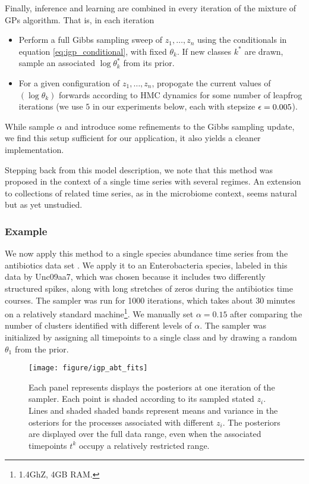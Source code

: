 \documentclass[14pt]{extarticle}
\begin{document}
Finally, inference and learning are combined in every iteration of the mixture
of GPs algorithm. That is, in each iteration
\begin{itemize}
\item Perform a full Gibbs sampling sweep of $z_1, \dots, z_n$ using the
  conditionals in equation \ref{eq:igp_conditional}, with fixed $\theta_k$. If
  new classes $k^\ast$ are drawn, sample an associated $\log \theta_k^\ast$ from
  its prior.
\item For a given configuration of $z_1, \dots, z_n$, propogate the current
  values of $\left(\log \theta_k\right)$ forwards according to HMC dynamics for
  some number of leapfrog iterations (we use $5$ in our experiments below, each
  with stepsize $\epsilon = 0.005$).
\end{itemize}

While \citep{rasmussen2006gaussian} sample $\alpha$ and introduce some
refinements to the Gibbs sampling update, we find this setup sufficient for our
application, it also yields a cleaner implementation.

Stepping back from this model description, we note that this method was
proposed in the context of a single time series with several regimes. An
extension to collections of related time series, as in the microbiome context,
seems natural but as yet unstudied.

\subsubsection{Example}
\label{subsubsec:igp_mix_example}

We now apply this method to a single species abundance time series from the
antibiotics data set \citep{dethlefsen2011incomplete}. We apply it to an
Enterobacteria species, labeled in this data by Unc09aa7, which was chosen
because it includes two differently structured spikes, along with long stretches
of zeros during the antibiotics time courses. The sampler was run for 1000
iterations, which takes about 30 minutes on a relatively standard
machine\footnote{1.4GhZ, 4GB RAM.}. We manually set $\alpha = 0.15$ after
comparing the number of clusters identified with different levels of $\alpha$.
The sampler was initialized by assigning all timepoints to a single class and by
drawing a random $\theta_1$ from the prior.

\begin{figure}
  \centering
  \texttt{[image: figure/igp\_abt\_fits]}
  \caption{Each panel represents displays the posteriors at one iteration of the
    sampler. Each point is shaded according to its sampled stated $z_i$. Lines
    and shaded shaded bands represent means and variance in the osteriors for
    the processes associated with different $z_i$. The posteriors are displayed
    over the full data range, even when the associated timepoints $t^k$ occupy a
    relatively restricted range. \label{fig:igp_abt_fits}}
\end{figure}
\end{document}
